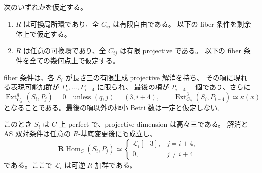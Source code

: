 \begin{lemma}
\label{lem:five-window-bar-lifting}
次のいずれかを仮定する。
\begin{enumerate}
\item $R$ は可換局所環であり、全 $C_{ij}$ は有限自由である。
  以下の fiber 条件を剰余体上で仮定する。
\item $R$ は任意の可換環であり、全 $C_{ij}$ は有限 projective である。
  以下の fiber 条件を全ての幾何点上で仮定する。
\end{enumerate}
fiber 条件は、各 $S_i$ が長さ三の有限生成 projective 解消を持ち、
その項に現れる表現可能加群が $P_i,\ldots,P_{i+4}$ に限られ、
最後の項が $P_{i+4}$ 一個であり、さらに
\[
 \operatorname{Ext}_{C_{\bar x}}^q(S_i,P_j)=0
 \quad\text{unless }(q,j)=(3,i+4),\qquad
 \operatorname{Ext}_{C_{\bar x}}^3(S_i,P_{i+4})\simeq\kappa(\bar x)
 \tag{BW-fiber}\label{eq:five-window-fiber-dual}
\]
となることである。最後の項以外の極小 Betti 数は一定と仮定しない。

このとき $S_i$ は $C$ 上 perfect で、projective dimension は高々三である。
解消と AS 双対条件は任意の $R$-基底変更後にも成立し、
\[
 \mathbf R\operatorname{Hom}_{C}(S_i,P_j)\simeq
 \begin{cases}\mathcal L_i[-3],&j=i+4,\\0,&j\ne i+4\end{cases}
 \tag{BW-dual}\label{eq:five-window-relative-dual}
\]
である。ここで $\mathcal L_i$ は可逆 $R$-加群である。
\end{lemma}

